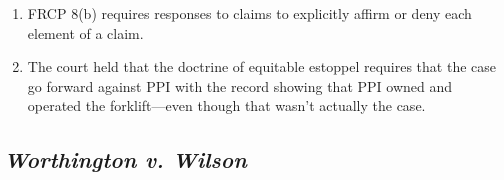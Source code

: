 \begin{enumerate}
    \item FRCP 8(b) requires responses to claims to explicitly affirm or deny each element of a claim.
    \item The court held that the doctrine of equitable estoppel requires that the case go forward against PPI with the record showing that PPI owned and operated the forklift---even though that wasn't actually the case.
\end{enumerate}

% 

\subsection{\emph{Worthington v. Wilson}}

